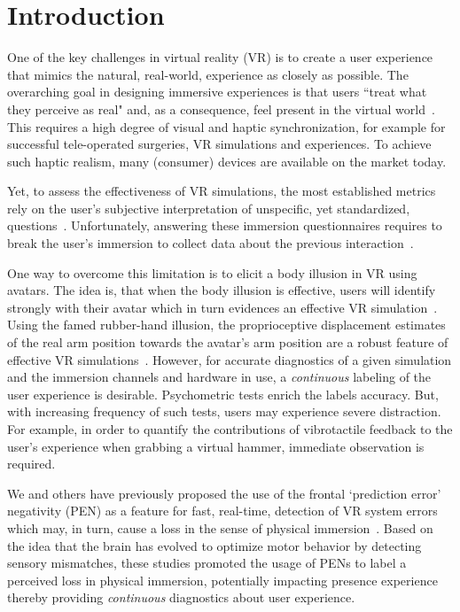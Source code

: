 \section{Introduction} 

One of the key challenges in virtual reality (VR) is to create a user experience that mimics the natural, real-world, experience as closely as possible. The overarching goal in designing immersive experiences is that users ``treat what they perceive as real" and, as a consequence, feel present in the virtual world~\cite{Slater2009-au}. This requires a high degree of visual and haptic synchronization, for example for successful tele-operated surgeries, VR simulations and experiences. To achieve such haptic realism, many (consumer) devices are available on the market today.

Yet, to assess the effectiveness of VR simulations, the most established metrics rely on the user’s subjective interpretation of unspecific, yet standardized, questions~\cite{Schubert2003-sq, Witmer1998-ew}. Unfortunately, answering these immersion questionnaires requires to break the user’s immersion to collect data about the previous interaction~\cite{Slater1999-dm}.

One way to overcome this limitation is to elicit a body illusion in VR using avatars. The idea is, that when the body illusion is effective, users will identify strongly with their avatar which in turn evidences an effective VR simulation~\cite{Kilteni2012-gm}. Using the famed rubber-hand illusion, the proprioceptive displacement estimates of the real arm position towards the avatar's arm position are a robust feature of effective VR simulations~\cite{Sanchez-Vives2010-mg}. 
However, for accurate diagnostics of a given simulation and the immersion channels and hardware in use, a \textit{continuous} labeling of the user experience is desirable. Psychometric tests enrich the labels accuracy. But, with increasing frequency of such tests, users may experience severe distraction. For example, in order to quantify the contributions of vibrotactile feedback to the user's experience when grabbing a virtual hammer, immediate observation is required.

We and others have previously proposed the use of the frontal `prediction error' negativity (PEN) as a feature for fast, real-time, detection of VR system errors which may, in turn, cause a loss in the sense of physical immersion~\cite{Gehrke2019-og, Si-mohammed2020-ru, Singh2018-qi}. Based on the idea that the brain has evolved to optimize motor behavior by detecting sensory mismatches, these studies promoted the usage of PENs to label a perceived loss in physical immersion, potentially impacting presence experience thereby providing \textit{continuous} diagnostics about user experience.

